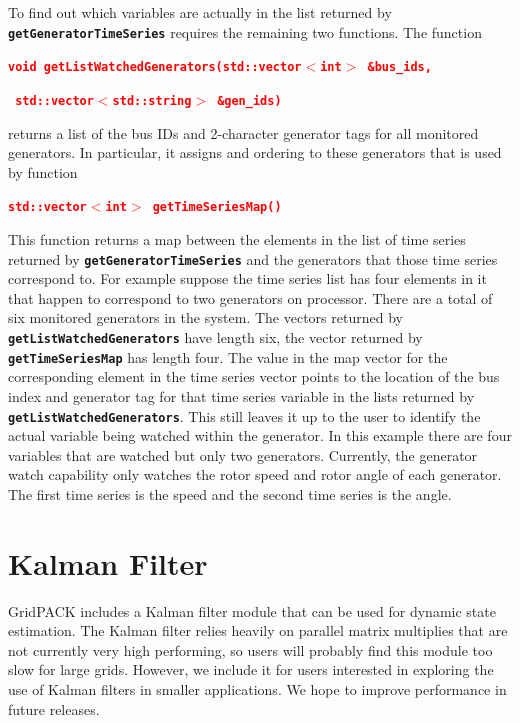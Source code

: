 \documentclass[12pt]{report} %
\begin{document}
To find out which variables are actually in the list returned by \texttt{\textbf{getGeneratorTimeSeries}} requires the remaining two functions. The function

\textcolor{red}{\texttt{\textbf{void getListWatchedGenerators(std::vector$\boldsymbol{\mathrm{<}}$int$\boldsymbol{\mathrm{>}}$ \&bus\_ids,}}}

\textcolor{red}{\texttt{\textbf{    std::vector$\boldsymbol{\mathrm{<}}$std::string$\boldsymbol{\mathrm{>}}$ \&gen\_ids)}}}

returns a list of the bus IDs and 2-character generator tags for all monitored generators. In particular, it assigns and ordering to these generators that is used by function

\textcolor{red}{\texttt{\textbf{std::vector$\boldsymbol{\mathrm{<}}$int$\boldsymbol{\mathrm{>}}$ getTimeSeriesMap()}}}

This function returns a map between the elements in the list of time series returned by \texttt{\textbf{getGeneratorTimeSeries}} and the generators that those time series correspond to. For example suppose the time series list has four elements in it that happen to correspond to two generators on processor. There are a total of six monitored generators in the system. The vectors returned by \texttt{\textbf{getListWatchedGenerators}} have length six, the vector returned by \texttt{\textbf{getTimeSeriesMap}} has length four. The value in the map vector for the corresponding element in the time series vector points to the location of the bus index and generator tag for that time series variable in the lists returned by \texttt{\textbf{getListWatchedGenerators}}. This still leaves it up to the user to identify the actual variable being watched within the generator. In this example there are four variables that are watched but only two generators. Currently, the generator watch capability only watches the rotor speed and rotor angle of each generator. The first time series is the speed and the second time series is the angle.

\section{Kalman Filter}

GridPACK includes a Kalman filter module that can be used for dynamic state estimation. The Kalman filter relies heavily on parallel matrix multiplies that are not currently very high performing, so users will probably find this module too slow for large grids. However, we include it for users interested in exploring the use of Kalman filters in smaller applications. We hope to improve performance in future releases.
\end{document}
